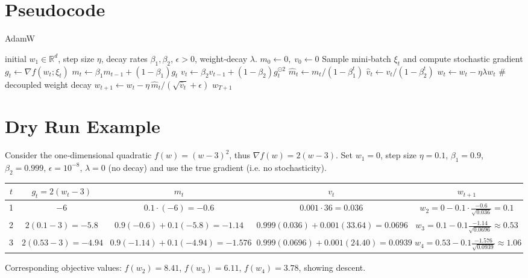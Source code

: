 \documentclass{article}
\newcommand{\R}{\mathbb{R}}
\begin{document}
\section*{Pseudocode}
\begin{algorithm}[H]
\caption{AdamW}
\begin{algorithmic}[1]
 initial $w_{1}\in\R^{d}$, step size $\eta$, decay rates $\beta_{1},\beta_{2}$,
               $\epsilon>0$, weight‑decay $\lambda$.
\STATE $m_{0}\gets 0,\; v_{0}\gets 0$
    \STATE Sample mini‑batch $\xi_{t}$ and compute stochastic gradient $g_{t}\gets\nabla f(w_{t};\xi_{t})$
    \STATE $m_{t}\gets\beta_{1} m_{t-1}+(1-\beta_{1}) g_{t}$
    \STATE $v_{t}\gets\beta_{2} v_{t-1}+(1-\beta_{2}) g_{t}^{\odot2}$
    \STATE $\hat m_{t}\gets m_{t}/(1-\beta_{1}^{t})$
    \STATE $\hat v_{t}\gets v_{t}/(1-\beta_{2}^{t})$
    \STATE $w_{t}\gets w_{t} - \eta\lambda w_{t}$ \hfill\# decoupled weight decay
    \STATE $w_{t+1}\gets w_{t} - \eta\,\hat m_{t}/(\sqrt{\hat v_{t}}+\epsilon)$
\ENDFOR
{} $w_{T+1}$
\end{algorithmic}
\end{algorithm}

\section*{Dry Run Example}
Consider the one‑dimensional quadratic $f(w)=(w-3)^{2}$, thus $\nabla f(w)=2(w-3)$.  
Set $w_{1}=0$, step size $\eta=0.1$, $\beta_{1}=0.9$, $\beta_{2}=0.999$, $\epsilon=10^{-8}$, $\lambda=0$ (no decay) and use the true gradient (i.e. no stochasticity).

\begin{center}
\begin{tabular}{c|c|c|c|c}
$t$ & $g_{t}=2(w_{t}-3)$ & $m_{t}$ & $v_{t}$ & $w_{t+1}$ \\ \hline
1 & $-6$ & $0.1\cdot(-6)=-0.6$ & $0.001\cdot36=0.036$ & $w_{2}=0-0.1\cdot\frac{-0.6}{\sqrt{0.036}}=0.1$\\
2 & $2(0.1-3)=-5.8$ & $0.9(-0.6)+0.1(-5.8)=-1.14$ &
   $0.999(0.036)+0.001(33.64)=0.0696$ &
   $w_{3}=0.1-0.1\frac{-1.14}{\sqrt{0.0696}} \approx 0.53$\\
3 & $2(0.53-3)=-4.94$ &
   $0.9(-1.14)+0.1(-4.94)=-1.576$ &
   $0.999(0.0696)+0.001(24.40)=0.0939$ &
   $w_{4}=0.53-0.1\frac{-1.576}{\sqrt{0.0939}}\approx 1.06$\\
\end{tabular}
\end{center}
Corresponding objective values: $f(w_{2})=8.41$, $f(w_{3})=6.11$, $f(w_{4})=3.78$, showing descent.
\end{document}

